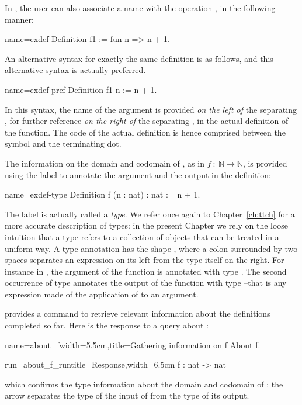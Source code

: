 In \Coq{}, the user can also associate a name with the operation
, in the following manner:

\begin{coq}{name=exdef}{}
Definition f1 := fun n => n + 1.
\end{coq}
An alternative syntax for exactly the same definition is as follows,
and this alternative syntax is actually preferred.

\begin{coq}{name=exdef-pref}{}
Definition f1 n := n + 1.
\end{coq}
In this syntax, the name of the argument  is provided
\emph{on the left of} the separating \C{:=}, for further reference
\emph{on the right of} the separating \C{:=}, in the actual
definition of the function. The code of the actual definition is
hence comprised between the \C{:=} symbol and the terminating dot.

The information on the domain and codomain of ,
as in \(f\ :\ {\mathbb{N}}\rightarrow{\mathbb{N}}\), is provided using
the  label to annotate the argument and the output in the
\Coq{} definition:

\begin{coq}{name=exdef-type}{}
Definition f (n : nat) : nat := n + 1.
\end{coq}
The label  is actually called a {\em type}.
We refer once again to Chapter~\ref{ch:ttch} for a more accurate
description of types: in the present Chapter we rely on the loose intuition
that a type refers to a collection of objects that can be treated in a
uniform way. A type annotation has the shape , where a colon
\C{:} surrounded by two spaces separates an expression  on its
left from the type  itself on the right. For instance in
, the argument  of the function  is annotated with
type . The second occurrence  of type
 annotates the output of the function with type  --that is any
expression made of the application of  to an argument.

\Coq{} provides a command to retrieve relevant information about the
definitions completed so far. Here is the response to a query about :

\begin{coq}{name=about_f}{width=5.5cm,title=Gathering information on f}
About f.
\end{coq}
\begin{coqout}{run=about_f_run}{title=Response,width=6.5cm}
f : nat -> nat
\end{coqout}
which confirms the type information about the domain and codomain of
: the arrow \C{->} separates the type of the input of  from
the type of its output.

